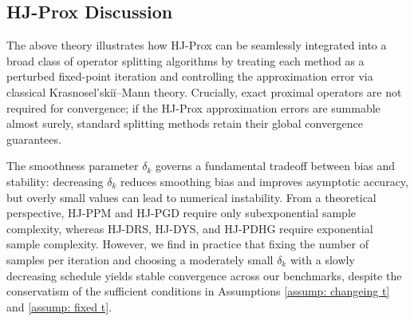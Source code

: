 \documentclass{article}
\theoremstyle{plain}
\theoremstyle{definition}
\theoremstyle{remark}
\begin{document}
\subsection{HJ-Prox Discussion}
The above theory illustrates how 
HJ-Prox can be seamlessly integrated into a broad class of operator splitting algorithms by treating each method as a perturbed fixed-point iteration and controlling the approximation error via classical Krasnosel'skiĭ–Mann theory. Crucially, exact proximal operators are not required for convergence; if the HJ-Prox approximation errors are summable almost surely, standard splitting methods retain their global convergence guarantees. 

The smoothness parameter $\delta_k$ governs a fundamental tradeoff between bias and stability: decreasing $\delta_k$ reduces smoothing bias and improves asymptotic accuracy, but overly small values can lead to numerical instability. From a theoretical perspective, HJ-PPM and HJ-PGD require only subexponential sample complexity, whereas HJ-DRS, HJ-DYS, and HJ-PDHG require exponential sample complexity. However, we find in practice that fixing the number of samples per iteration and choosing a moderately small $\delta_k$ with a slowly decreasing schedule yields stable convergence across our benchmarks, despite the conservatism of the sufficient conditions in Assumptions \ref{assump: changeing t} and \ref{assump: fixed t}.
\end{document}
